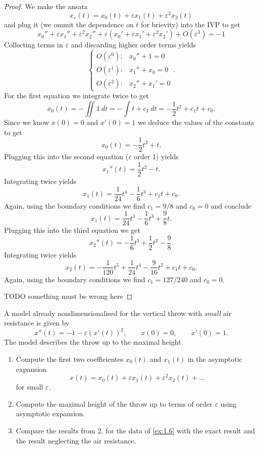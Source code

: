 \begin{proof}
  We make the ansatz
  \[
    x_\varepsilon(t) = x_0(t) + \varepsilon x_1(t) + \varepsilon^2 x_2(t)
  \]
  and plug it (we ommit the dependence on $t$ for brievity) into the IVP to get
  \[
  x_0'' + \varepsilon x_1'' + \varepsilon^2 x_2''
  + \varepsilon \left( x_0' + \varepsilon x_1' + \varepsilon^2 x_2' \right)
  + O(\varepsilon^3) = -1
  \]
  Collecting terms in $\varepsilon$ and discarding higher order terms yields
  \[
    \begin{cases}
      O(\varepsilon^0): &x_0'' + 1 = 0 \\
      O(\varepsilon^1): &x_1'' + x_0 = 0 \\
      O(\varepsilon^2): &x_2'' + x_1' = 0
    \end{cases}.
  \]
  For the first equation we integrate twice to get
  \[
    x_0(t) = - \iint 1\ dt = - \int t + c_1\ dt = - \frac{1}{2} t^2 + c_1t + c_0.
  \]
  Since we know $x(0) = 0$ and $x'(0) = 1$ we deduce the values of the
  constants to get
  \[
    x_0(t) = - \frac{1}{2} t^2  + t.
  \]
  Plugging this into the second equation ($\varepsilon$ order 1) yields
  \[
    x_1''(t) = \frac{1}{2} t^2  - t.
  \]
  Integrating twice yields
  \[
    x_1(t) = \frac{1}{24} t^4 - \frac{1}{6} t^3 + c_1 t + c_0.
  \]
  Again, using the boundary conditions we find $c_1 = 9 / 8$ and $c_0 = 0$
  and conclude
  \[
    x_1(t) = \frac{1}{24} t^4 - \frac{1}{6} t^3 + \frac{9}{8}  t.
  \]
  Plugging this into the third equation we get
  \[
    x_2''(t) = - \frac{1}{6} t^3 + \frac{1}{2} t^2 - \frac{9}{8} .
  \]
  Integrating twice yields
  \[
    x_2(t) = - \frac{1}{120} t^5 + \frac{1}{24} t^4 - \frac{9}{16} t^2 + c_1 t + c_0.
  \]
  Again, using the boundary conditions we find $c_1 = 127 / 240$ and $c_0 = 0$.

  TODO something must be wrong here
\end{proof}

\begin{ex}
  [1.9]

  A model already nondimensionalised for the vertical throw with \textit{small}
  air resistance is given by
  \[
    x''(t) = -1 - \varepsilon(x'(t))^2,\qquad
    x(0) = 0,\qquad
    x'(0) = 1.
  \]
  The model describes the throw up to the maximal height.

  \begin{enumerate}
    \item Compute the first two coefficientes $x_0(t)$ and $x_1(t)$ in the asymptotic expansion
      \[
        x(t) = x_0(t) + \varepsilon x_1(t) + \varepsilon^2 x_2(t) + \dots
      \]
      for small $\varepsilon$.
    \item Compute the maximal height of the throw up to terms of order
      $\varepsilon$ using asymptotic expansion.
    \item Compare the results from 2. for the data of \autoref{ex:1.6} with the
      exact result and the result neglecting the air resistance.
  \end{enumerate}
\end{ex}


